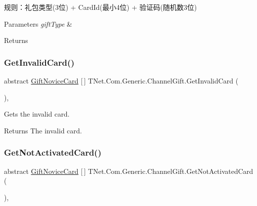 规则：礼包类型(3位) + Card\+Id(最小4位) + 验证码(随机数3位) 


\begin{DoxyParams}{Parameters}
{\em gift\+Type} & \\
\hline
\end{DoxyParams}
\begin{DoxyReturn}{Returns}

\end{DoxyReturn}
\mbox{\label{class_t_net_1_1_com_1_1_generic_1_1_channel_gift_a0c72dd14fb3b26d0a759b9f459fd8190}} 
\subsubsection{\texorpdfstring{Get\+Invalid\+Card()}{GetInvalidCard()}}
{\footnotesize\ttfamily abstract \mbox{\hyperlink{class_t_net_1_1_com_1_1_model_1_1_gift_novice_card}{Gift\+Novice\+Card}} \mbox{[}$\,$\mbox{]} T\+Net.\+Com.\+Generic.\+Channel\+Gift.\+Get\+Invalid\+Card (\begin{DoxyParamCaption}{ }\end{DoxyParamCaption})\hspace{0.3cm}{\ttfamily [protected]}, {}}



Gets the invalid card. 

\begin{DoxyReturn}{Returns}
The invalid card.
\end{DoxyReturn}
\mbox{\label{class_t_net_1_1_com_1_1_generic_1_1_channel_gift_a5120dcae903f683e53fef1c1c2017fd7}} 
\subsubsection{\texorpdfstring{Get\+Not\+Activated\+Card()}{GetNotActivatedCard()}}
{\footnotesize\ttfamily abstract \mbox{\hyperlink{class_t_net_1_1_com_1_1_model_1_1_gift_novice_card}{Gift\+Novice\+Card}} \mbox{[}$\,$\mbox{]} T\+Net.\+Com.\+Generic.\+Channel\+Gift.\+Get\+Not\+Activated\+Card (\begin{DoxyParamCaption}{ }\end{DoxyParamCaption})\hspace{0.3cm}{\ttfamily [protected]}, {}}



